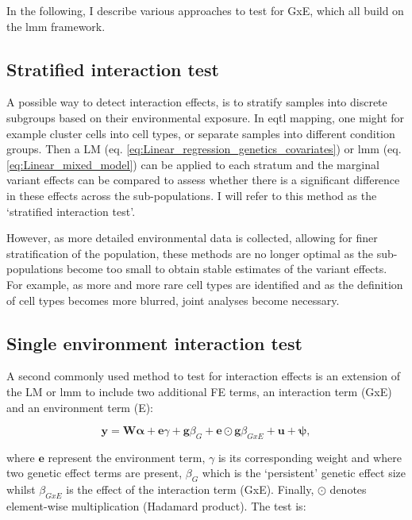 In the following, I describe various approaches to test for GxE, which all build on the \gls{lmm} framework. 

\subsection{Stratified interaction test}

A possible way to detect interaction effects, is to stratify samples into discrete subgroups based on their environmental exposure.
In \gls{eqtl} mapping, one might for example cluster cells into cell types, or separate samples into different condition groups.
Then a LM (eq. \eqref{eq:Linear_regression_genetics_covariates}) or \gls{lmm} (eq. \eqref{eq:Linear_mixed_model}) can be applied to each stratum and the marginal variant effects can be compared to assess whether there is a significant difference in these effects across the sub-populations.
I will refer to this method as the `stratified interaction test'.

However, as more detailed environmental data is collected, allowing for finer stratification of the population, these methods are no longer optimal as the sub-populations become too small to obtain stable estimates of the variant effects.
For example, as more and more rare cell types are identified and as the definition of cell types becomes more blurred, joint analyses become necessary.


\subsection{Single environment interaction test}

A second commonly used method to test for interaction effects is an extension of the LM or \gls{lmm} to include two additional FE terms, an interaction term (GxE) and an environment term (E):

\begin{equation}\label{eq:Interaction_test_FE_LMM}
 \mathbf{y} =  \mathbf{W}\boldsymbol{\alpha} + \mathbf{e}\gamma  + \mathbf{g}\beta_G + \mathbf{e}\odot\mathbf{g}\beta_{GxE} + \mathbf{u} + \boldsymbol{\psi}, 
\end{equation}

where $\mathbf{e}$ represent the environment term, $\gamma$ is its corresponding weight and where two genetic effect terms are present, $\beta_G$ which is the `persistent' genetic effect size whilst $\beta_{GxE}$ is the effect of the interaction term (GxE).
Finally, $\odot$ denotes element-wise multiplication (Hadamard product).
The test is:

